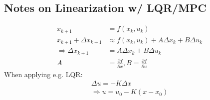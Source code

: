 \subsection{Notes on Linearization w/ LQR/MPC}
\begin{align}
    x_{k+1} & = f(x_k, u_k) \\
    x_{k+1} + \Delta x_{k+1} & \approx f(x_k, u_k) + A \Delta x_k + B \Delta u_k \\
    \Rightarrow \Delta x_{k+1} & = A \Delta x_k + B \Delta u_k \\
    A & = \frac{\partial f}{\partial x}, B = \frac{\partial f}{\partial u}
\end{align}
When applying e.g. LQR:
\begin{align}
    \Delta u = -K \Delta x \\
    \Rightarrow u = u_0 - K(x - x_0) 
\end{align}








